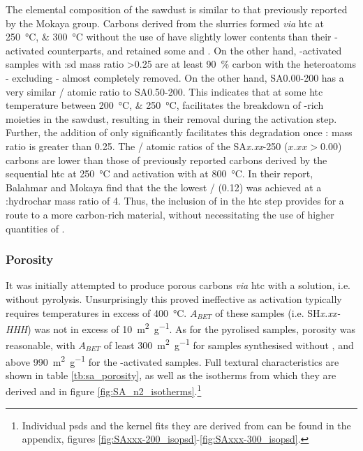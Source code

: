 The elemental composition of the sawdust is similar to that previously reported by the Mokaya group.\citep{Balahmar2019Pre, Balahmar2017Biomass} Carbons derived from the slurries formed \textit{via} \gls{htc} at \qtylist[list-units=single, list-final-separator={or }]{250;300}{\degreeCelsius} without the use of  have slightly lower  contents than their -activated counterparts, and retained some  and . On the other hand, -activated samples with :\acrshort{sd} mass ratio \num{>0.25} are at least \qty{90}{\percent} carbon with the heteroatoms - excluding  - almost completely removed. On the other hand, SA0.00-200 has a very similar / atomic ratio to SA0.50-200. This indicates that at some \gls{htc} temperature between \qtylist[list-units=single]{200;250}{\degreeCelsius},  facilitates the breakdown of -rich moieties in the sawdust, resulting in their removal during the activation step. Further, the addition of  only significantly facilitates this degradation once : mass ratio is greater than 0.25. The / atomic ratios of the SA\textit{x.xx}-250 ($x.xx>0.00$) carbons are  lower than those of previously reported carbons derived by the sequential \gls{htc} at \qty{250}{\degreeCelsius} and activation with  at \qty{800}{\degreeCelsius}. In their report, Balahmar and Mokaya find that the the lowest / (\num{0.12}) was achieved at a :\gls{hydrochar} mass ratio of \num{4}.\citep{Balahmar2017Biomass} Thus, the inclusion of  in the \gls{htc} step provides for a route to a more carbon-rich material, without necessitating the use of higher quantities of .

\subsubsection{Porosity}

It was initially attempted to produce porous carbons \textit{via} \gls{htc} with a  solution, i.e. without \gls{pyrolysis}. Unsurprisingly this proved ineffective as \gls{activation} typically requires temperatures in excess of \qty{400}{\degreeCelsius}.\citep{Sevilla2014Energy, Blankenship2022Modulating} $A_{BET}$ of these samples (i.e. SH\textit{x.xx-HHH}) was not in excess of \qty{10}{\metre\squared\per\gram}. As for the pyrolised samples, porosity was reasonable, with $A_{BET}$ of least \qty{300}{\metre\squared\per\gram} for samples synthesised without , and above \qty{990}{\metre\squared\per\gram} for the -activated samples. Full textural characteristics are shown in table \ref{tb:sa_porosity}, as well as the isotherms from which they are derived and  in figure \ref{fig:SA_n2_isotherms}.\footnote{Individual \glspl{psd} and the kernel fits they are derived from can be found in the appendix, figures \ref{fig:SAxxx-200_isopsd}-\ref{fig:SAxxx-300_isopsd}.} 

